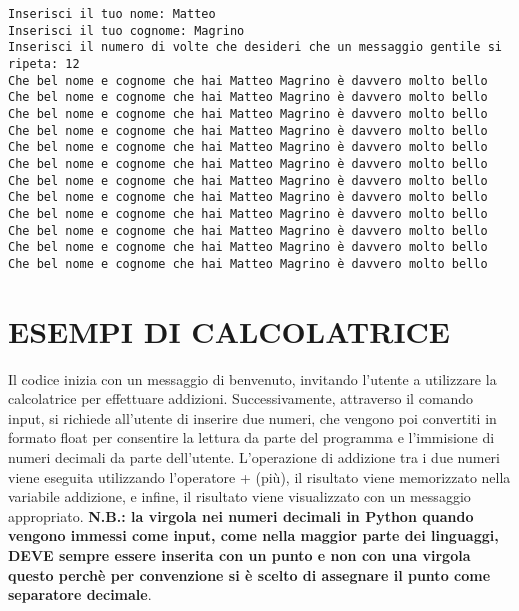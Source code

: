 \documentclass[11pt]{article}
\begin{document}
    \begin{Verbatim}[commandchars=\\\{\}]
Inserisci il tuo nome: Matteo
Inserisci il tuo cognome: Magrino
Inserisci il numero di volte che desideri che un messaggio gentile si ripeta: 12
Che bel nome e cognome che hai Matteo Magrino è davvero molto bello
Che bel nome e cognome che hai Matteo Magrino è davvero molto bello
Che bel nome e cognome che hai Matteo Magrino è davvero molto bello
Che bel nome e cognome che hai Matteo Magrino è davvero molto bello
Che bel nome e cognome che hai Matteo Magrino è davvero molto bello
Che bel nome e cognome che hai Matteo Magrino è davvero molto bello
Che bel nome e cognome che hai Matteo Magrino è davvero molto bello
Che bel nome e cognome che hai Matteo Magrino è davvero molto bello
Che bel nome e cognome che hai Matteo Magrino è davvero molto bello
Che bel nome e cognome che hai Matteo Magrino è davvero molto bello
Che bel nome e cognome che hai Matteo Magrino è davvero molto bello
Che bel nome e cognome che hai Matteo Magrino è davvero molto bello
    \end{Verbatim}

    \section{ESEMPI DI CALCOLATRICE}\label{esempi-di-calcolatrice}

    Il codice inizia con un messaggio di benvenuto, invitando l'utente a
utilizzare la calcolatrice per effettuare addizioni. Successivamente,
attraverso il comando input, si richiede all'utente di inserire due
numeri, che vengono poi convertiti in formato float per consentire la
lettura da parte del programma e l'immisione di numeri decimali da parte
dell'utente. L'operazione di addizione tra i due numeri viene eseguita
utilizzando l'operatore + (più), il risultato viene memorizzato nella
variabile addizione, e infine, il risultato viene visualizzato con un
messaggio appropriato. \textbf{N.B.: la virgola nei numeri decimali in
Python quando vengono immessi come input, come nella maggior parte dei
linguaggi, DEVE sempre essere inserita con un punto e non con una
virgola questo perchè per convenzione si è scelto di assegnare il punto
come separatore decimale}.
\end{document}
